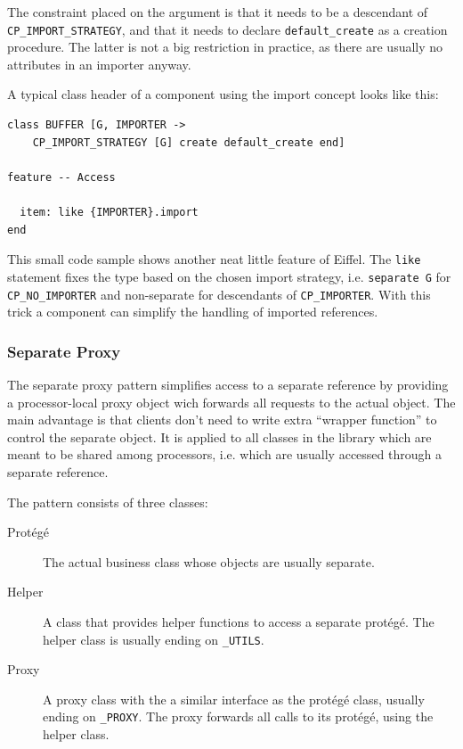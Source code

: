 \documentclass[a4paper,10pt]{article}
\begin{document}
The constraint placed on the argument is that it needs to be a descendant of \lstinline!CP_IMPORT_STRATEGY!, and that it needs to declare \lstinline!default_create! as a creation procedure.
The latter is not a big restriction in practice, as there are usually no attributes in an importer anyway.

A typical class header of a component using the import concept looks like this:
\begin{lstlisting}[language=OOSC2Eiffel, captionpos=b, caption={An example component with import.}]
class BUFFER [G, IMPORTER -> 
	CP_IMPORT_STRATEGY [G] create default_create end]

feature -- Access

  item: like {IMPORTER}.import
end
\end{lstlisting}

This small code sample shows another neat little feature of Eiffel.
The \lstinline!like! statement fixes the type based on the chosen import strategy, i.e. \lstinline!separate G! for \lstinline!CP_NO_IMPORTER! and non-separate for descendants of \lstinline!CP_IMPORTER!.
With this trick a component can simplify the handling of imported references.

\subsubsection{Separate Proxy}

The separate proxy pattern simplifies access to a separate reference by providing a processor-local proxy object wich forwards all requests to the actual object.
The main advantage is that clients don't need to write extra ``wrapper function'' to control the separate object.
It is applied to all classes in the library which are meant to be shared among processors, i.e. which are usually accessed through a separate reference.

The pattern consists of three classes:
\begin{description}
 \item [Protégé] The actual business class whose objects are usually separate.
 \item [Helper] A class that provides helper functions to access a separate protégé.
  The helper class is usually ending on \lstinline!_UTILS!.
 \item [Proxy] A proxy class with the a similar interface as the protégé class, usually ending on \lstinline!_PROXY!.
    The proxy forwards all calls to its protégé, using the helper class.
\end{description}
\end{document}
